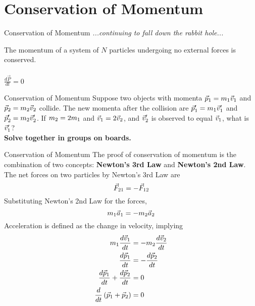 \documentclass{beamer}
\begin{document}
\section{Conservation of Momentum}

\begin{frame}{Conservation of Momentum}
\textit{...continuing to fall down the rabbit hole...} \\ \vspace{1cm}
\begin{tcolorbox}[colback=white,colframe=red!40!blue,title=Conservation of Momentum]
\alert{The momentum of a system of $N$ particles undergoing no external forces is conserved.} \\ \\
\alert{$\frac{d\vec{P}}{dt}=0$}
\end{tcolorbox}
\end{frame}

\begin{frame}{Conservation of Momentum}
Suppose two objects with momenta $\vec{p}_{\rm 1} = m_{\rm 1}\vec{v}_{\rm 1}$ and $\vec{p}_{\rm 2} = m_{\rm 2}\vec{v}_{\rm 2}$ collide. The new momenta after the collision are $\vec{p}'_{\rm 1} = m_{\rm 1}\vec{v}'_{\rm 1}$ and $\vec{p}'_{\rm 2} = m_{\rm 2}\vec{v}'_{\rm 2}$.  If $m_{\rm 2} = 2 m_{\rm 1}$ and $\vec{v}_{\rm 1} = 2\vec{v}_{\rm 2}$, and $\vec{v}'_{\rm 2}$ is observed to equal $\vec{v}_{\rm 1}$, what is $\vec{v}'_{\rm 1}$? \\ \vspace{1cm}
\textbf{Solve together in groups on boards.}
\end{frame}

\begin{frame}{Conservation of Momentum}
\small
The proof of conservation of momentum is the combination of two concepts: \alert{\textbf{Newton's 3rd Law}} and \alert{\textbf{Newton's 2nd Law}}.  The net forces on two particles by Newton's 3rd Law are 
\begin{equation}
\vec{F}_{\rm 21} = -\vec{F}_{\rm 12}
\end{equation}
Substituting Newton's 2nd Law for the forces,
\begin{equation}
m_{\rm 1} \vec{a}_{\rm 1} = -m_{\rm 2}\vec{a}_{\rm 2}
\end{equation}
Acceleration is defined as the change in velocity, implying
\begin{align}
m_{\rm 1} \frac{d\vec{v}_{\rm 1}}{dt} &= -m_{\rm 2} \frac{d\vec{v}_{\rm 2}}{dt} \\
\frac{d\vec{p}_{\rm 1}}{dt} &= -\frac{d\vec{p}_{\rm 2}}{dt} \\
\frac{d\vec{p}_{\rm 1}}{dt} + \frac{d\vec{p}_{\rm 2}}{dt} &= 0 \\
\frac{d}{dt}\left(\vec{p}_{\rm 1} + \vec{p}_{\rm 2}\right) &= 0
\end{align}
\end{frame}
\end{document}
